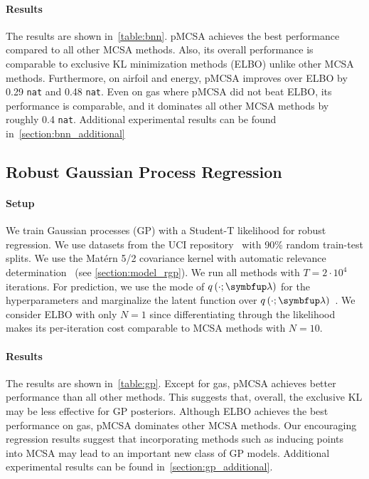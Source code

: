 

\vspace{-0.1in}
\paragraph{Results}
The results are shown in~\cref{table:bnn}.
pMCSA achieves the best performance compared to all other MCSA methods.
Also, its overall performance is comparable to exclusive KL minimization methods (ELBO) unlike other MCSA methods.
Furthermore, on \textsf{airfoil} and \textsf{energy}, pMCSA improves over ELBO by 0.29 \texttt{nat} and 0.48 \texttt{nat}.
Even on \textsf{gas} where pMCSA did not beat ELBO, its performance is comparable, and it dominates all other MCSA methods by roughly 0.4 \texttt{nat}.
Additional experimental results can be found in~\cref{section:bnn_additional}

  \vspace{-0.1in}
\subsection{Robust Gaussian Process Regression}\label{section:bgp}
  \vspace{-0.07in}
\paragraph{Setup}
We train Gaussian processes (GP) with a Student-T likelihood for robust regression.
We use datasets from the UCI repository~\citep{Dua:2019} with 90\% random train-test splits.
We use the Mat\'ern 5/2 covariance kernel with automatic relevance determination~\citep{neal_bayesian_1996} (see \cref{section:model_rgp}).
We run all methods with \(T=2\cdot10^4\) iterations.
For prediction, we use the mode of \(q\left(\cdot; \vlambda\right)\) for the hyperparameters and marginalize the latent function over \(q\left(\cdot; \vlambda\right)\)~\citep{rasmussen_gaussian_2006}.
We consider ELBO with only \(N=1\) since differentiating through the likelihood makes its per-iteration cost comparable to MCSA methods with \(N=10\).



\vspace{-0.1in}
\paragraph{Results}
The results are shown in~\cref{table:gp}.
Except for \textsf{gas}, pMCSA achieves better performance than all other methods.
This suggests that, overall, the exclusive KL may be less effective for GP posteriors.
Although ELBO achieves the best performance on \textsf{gas}, pMCSA dominates other MCSA methods.
Our encouraging regression results suggest that incorporating methods such as inducing points~\citep{NIPS2005_4491777b} into MCSA may lead to an important new class of GP models.
Additional experimental results can be found in~\cref{section:gp_additional}.

